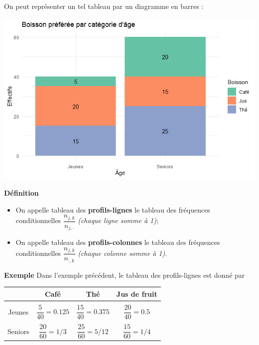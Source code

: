 \documentclass[aspectratio=169,xcolor=dvipsnames]{beamer}
\begin{document}
\begin{frame}
\textcolor{nyubluedarker}{\faLightbulb[regular]} On peut représenter un tel tableau par un diagramme en barres :

	\begin{center}
	\includegraphics[scale=0.7]{lien_quali_raw.png}
	\end{center}
\end{frame}

\begin{frame}
	\begin{block}{\textbf{Définition}}
		\begin{itemize}
		\item On appelle tableau des \textbf{profils-lignes} le tableau des fréquences conditionnelles $\dfrac{n_{j,k}}{n_{j,\cdot}}$ \emph{(chaque ligne somme à 1)};
		\item On appelle tableau des \textbf{profils-colonnes} le tableau des fréquences conditionnelles $\dfrac{n_{j,k}}{n_{\cdot,k}}$ \emph{(chaque colonne somme à 1)}.
		\end{itemize}
	\end{block}
	
	\begin{exampleblock}{\textbf{Exemple}}
	Dans l'exemple précédent, le tableau des profils-lignes est donné par
		\begin{center}
		\begin{scriptsize}
		\begin{tabular}{|c|c|c|c|}
		\hline
		 & Café & Thé & Jus de fruit \\
		\hline
		 & & & \\[-10pt]
		Jeunes & $\dfrac{5}{40} = 0.125$ & $\dfrac{15}{40} = 0.375$ & $\dfrac{20}{40} = 0.5$  \\[5pt] \hline
		 & & & \\[-10pt]
		Seniors & $\dfrac{20}{60} = 1/3 $ & $\dfrac{25}{60} = 5/12$ & $\dfrac{15}{60} = 1/4$ \\[5pt] \hline
		\end{tabular}
		\end{scriptsize}
		\end{center}
	\end{exampleblock}
\end{frame}
\end{document}
